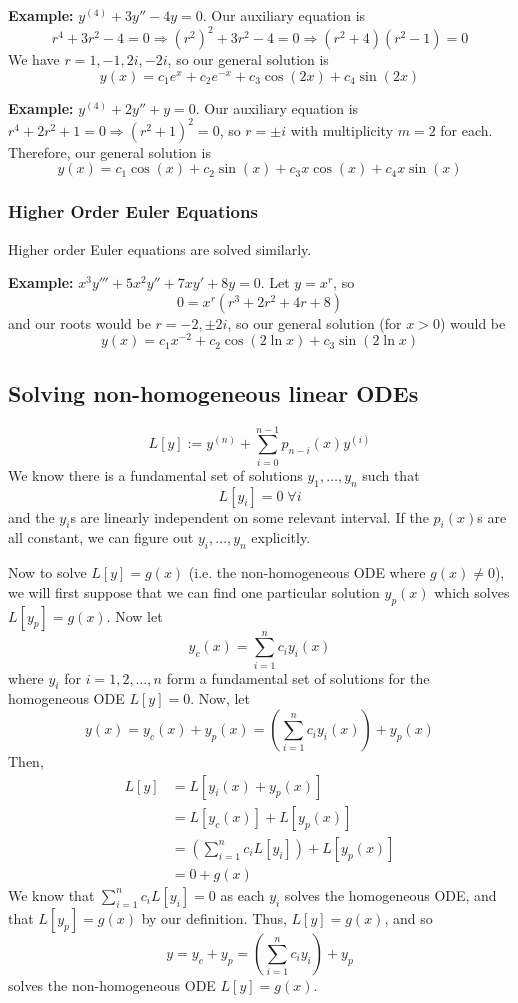 \documentclass[11pt]{article}
\newcommand{\example}{\textbf{Example: }}
\begin{document}
	\example $y^{(4)} + 3y'' - 4y = 0$. Our auxiliary equation is
		$$ r^4 + 3 r^2 - 4 = 0 \Rightarrow (r^2)^2 + 3r^2 - 4 = 0 \Rightarrow (r^2 + 4)(r^2 - 1) = 0 $$
	We have $r = 1, -1, 2i, -2i$, so our general solution is
		$$ y(x) = c_1 e^x + c_2 e^{-x} + c_3 \cos(2x) + c_4 \sin(2x) $$

	\example $y^{(4)} + 2y'' + y = 0$. Our auxiliary equation is $r^4 + 2r^2 + 1 = 0 \Rightarrow (r^2 + 1)^2 = 0$, so $r = \pm i$ with multiplicity $m = 2$ for each. Therefore, our general solution is
		$$ y(x) = c_1 \cos(x) + c_2 \sin(x) + c_3 x \cos(x) + c_4 x \sin(x) $$

\subsubsection{Higher Order Euler Equations}
	Higher order Euler equations are solved similarly.

	\example $x^3 y''' + 5 x^2 y'' + 7xy' + 8y = 0$. Let $y = x^r$, so
		$$ 0 = x^r (r^3 + 2r^2 + 4r + 8) $$
	and our roots would be $r = -2, \pm 2i$, so our general solution (for $x > 0$) would be
		$$ y(x) = c_1 x^{-2} + c_2 \cos(2 \ln x) + c_3 \sin(2 \ln x) $$

\subsection{Solving non-homogeneous linear ODEs}
		$$ L[y] := y^{(n)} + \sum_{i=0}^{n-1} p_{n-i} (x) y^{(i)} $$
	We know there is a fundamental set of solutions $y_1,\ldots,y_n$ such that
		$$ L[y_i] = 0 \; \forall i $$
	and the $y_i$s are linearly independent on some relevant interval. If the $p_i(x)$s are all constant, we can figure out $y_i, \ldots, y_n$ explicitly.

	Now to solve $L[y] = g(x)$ (i.e. the non-homogeneous ODE where $g(x) \neq 0$), we will first suppose that we can find one particular solution $y_p (x)$ which solves $L[y_p] = g(x)$. Now let
		$$ y_c (x) = \sum_{i = 1}^n c_i y_i (x) $$
	where $y_i$ for $i = 1, 2, \ldots, n$ form a fundamental set of solutions for the homogeneous ODE $L[y] = 0$. Now, let
		$$ y(x) = y_c (x) + y_p (x) = \left(\sum_{i = 1}^n c_i y_i (x)\right) + y_p(x) $$
	Then,
		\begin{align*}
			L[y] &= L[y_i (x) + y_p (x)] \\
				&= L[y_c(x)] + L[y_p(x)] \\
				&= \left(\sum_{i = 1}^n c_i L[y_i]\right) + L[y_p(x)] \\
				&= 0 + g(x)
		\end{align*}
	We know that $\sum_{i = 1}^n c_i L[y_i] = 0$ as each $y_i$ solves the homogeneous ODE, and that $L[y_p]=g(x)$ by our definition. Thus, $L[y] = g(x)$, and so
		$$ y = y_c + y_ p = \left(\sum_{i = 1}^n c_i y_i \right) + y_p $$
	solves the non-homogeneous ODE $L[y] = g(x)$.
\end{document}
